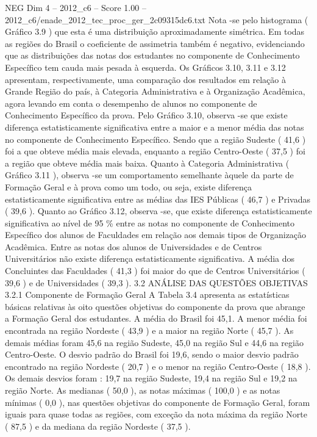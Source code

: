 \begin{textsample}{NEG Dim 4 – 2012\_c6 – Score 1.00 – 2012\_c6/enade\_2012\_tec\_proc\_ger\_2c09315dc6.txt}
Nota -se pelo histograma ( Gráfico 3.9 ) que esta é uma distribuição aproximadamente simétrica.
Em todas as regiões do Brasil o coeficiente de assimetria também é negativo, evidenciando que as distribuições das notas dos estudantes no componente de Conhecimento Específico tem cauda mais pesada à esquerda.
Os Gráficos 3.10, 3.11 e 3.12 apresentam, respectivamente, uma comparação dos resultados em relação à Grande Região do país, à Categoria Administrativa e à Organização Acadêmica, agora levando em conta o desempenho de alunos no componente de Conhecimento Específico da prova.
Pelo Gráfico 3.10, observa -se que existe diferença estatisticamente significativa entre a maior e a menor média das notas no componente de Conhecimento Específico.
Sendo que a região Sudeste ( 41,6 ) foi a que obteve média mais elevada, enquanto a região Centro-Oeste ( 37,5 ) foi a região que obteve média mais baixa.
Quanto à Categoria Administrativa ( Gráfico 3.11 ), observa -se um comportamento semelhante àquele da parte de Formação Geral e à prova como um todo, ou seja, existe diferença estatisticamente significativa entre as médias das IES Públicas ( 46,7 ) e Privadas ( 39,6 ).
Quanto ao Gráfico 3.12, observa -se, que existe diferença estatisticamente significativa ao nível de 95 \% entre as notas no componente de Conhecimento Específico dos alunos de Faculdades em relação aos demais tipos de Organização Acadêmica.
Entre as notas dos alunos de Universidades e de Centros Universitários não existe diferença estatisticamente significativa.
A média dos Concluintes das Faculdades ( 41,3 ) foi maior do que de Centros Universitários ( 39,6 ) e de Universidades ( 39,3 ). 3.2 ANÁLISE DAS QUESTÕES OBJETIVAS 3.2.1 Componente de Formação Geral A Tabela 3.4 apresenta as estatísticas básicas relativas às oito questões objetivas do componente da prova que abrange a Formação Geral dos estudantes.
A média do Brasil foi 45,1.
A menor média foi encontrada na região Nordeste ( 43,9 ) e a maior na região Norte ( 45,7 ).
As demais médias foram 45,6 na região Sudeste, 45,0 na região Sul e 44,6 na região Centro-Oeste.
O desvio padrão do Brasil foi 19,6, sendo o maior desvio padrão encontrado na região Nordeste ( 20,7 ) e o menor na região Centro-Oeste ( 18,8 ).
Os demais desvios foram : 19,7 na região Sudeste, 19,4 na região Sul e 19,2 na região Norte.
As medianas ( 50,0 ), as notas máximas ( 100,0 ) e as notas mínimas ( 0,0 ), nas questões objetivas do componente de Formação Geral, foram iguais para quase todas as regiões, com exceção da nota máxima da região Norte ( 87,5 ) e da mediana da região Nordeste ( 37,5 ).

\end{textsample}
